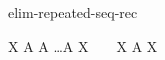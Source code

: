 \begin{circuslaw}{elim-repeated-seq-rec}
\begin{circusaction*}
  \circmu X \circspot A \circseq A \circseq \dots \circseq A \circseq X ~ \equiv ~ \circmu X \circspot A \circseq X
\end{circusaction*}
\end{circuslaw}
